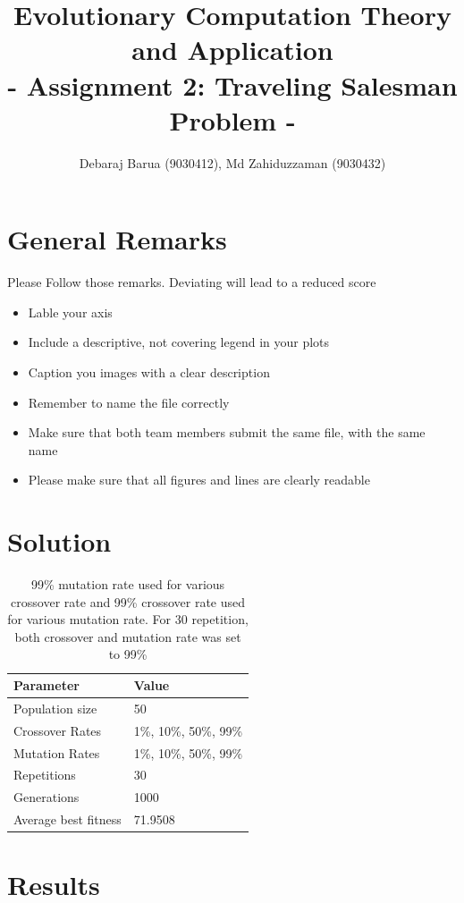 \documentclass[a4paper, 12pt]{article}
\title{Evolutionary Computation Theory and Application  \\
				- Assignment 2: Traveling Salesman Problem -}
\author{Debaraj Barua (9030412), Md Zahiduzzaman (9030432)}
\date{}
\begin{document}
\maketitle

\section{General Remarks }

Please Follow those remarks. Deviating will lead to a reduced score

\begin{itemize}
	\item Lable your axis 
	\item Include a descriptive, not covering legend in your plots
	\item Caption you images with a clear description
	\item Remember to name the file correctly
	\item Make sure that both team members submit the same file, with the same name
	\item Please make sure that all figures and lines are clearly readable
\end{itemize}

\section{Solution}

\begin{table} [h!]
	  \centering
\begin{tabular}{|l|l|}
\hline
\textbf{Parameter} & \textbf{Value}   \\
\hline
Population size & 50 \\
\hline
Crossover Rates &  1\%, 10\%, 50\%, 99\% \\
\hline
Mutation Rates & 1\%, 10\%, 50\%, 99\% \\
\hline
Repetitions & 30 \\
\hline
Generations & 1000 \\
\hline
Average best fitness		 & 71.9508 \\
\hline
\end{tabular}
\caption{99\% mutation rate used for various crossover rate and 99\% crossover rate used for various mutation rate. For 30 repetition, both crossover and mutation rate was set to 99\% }
\label{table:defparams}
\end{table}

\newpage
\section{Results}
\end{document}
